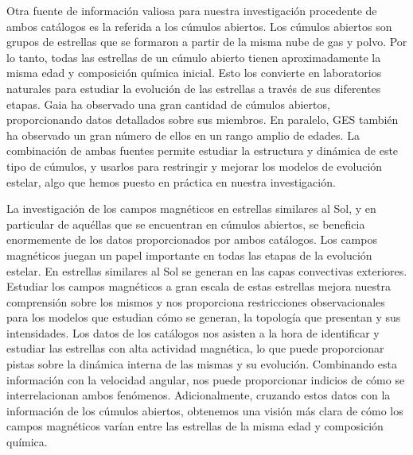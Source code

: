 Otra fuente de información valiosa para nuestra investigación procedente de ambos catálogos es la referida a los cúmulos abiertos. Los cúmulos abiertos son grupos de estrellas que se formaron a partir de la misma nube de gas y polvo. Por lo tanto, todas las estrellas de un cúmulo abierto tienen aproximadamente la misma edad y composición química inicial. Esto los convierte en laboratorios naturales para estudiar la evolución de las estrellas a través de sus diferentes etapas. Gaia ha observado una gran cantidad de cúmulos abiertos, proporcionando datos detallados sobre sus miembros. En paralelo, GES también ha observado un gran número de ellos en un rango amplio de edades. La combinación de ambas fuentes permite estudiar la estructura y dinámica de este tipo de cúmulos, y usarlos para restringir y mejorar los modelos de evolución estelar, algo que hemos puesto en práctica en nuestra investigación.\par

La investigación de los campos magnéticos en estrellas similares al Sol, y en particular de aquéllas que se encuentran en cúmulos abiertos, se beneficia enormemente de los datos proporcionados por ambos catálogos. Los campos magnéticos juegan un papel importante en todas las etapas de la evolución estelar. En estrellas similares al Sol se generan en las capas convectivas exteriores. Estudiar los campos magnéticos a gran escala de estas estrellas mejora nuestra comprensión sobre los mismos y nos proporciona restricciones observacionales para los modelos que estudian cómo se generan, la topología que presentan y sus intensidades. Los datos de los catálogos nos asisten a la hora de identificar y estudiar las estrellas con alta actividad magnética, lo que puede proporcionar pistas sobre la dinámica interna de las mismas y su evolución. Combinando esta información con la velocidad angular, nos puede proporcionar indicios de cómo se interrelacionan ambos fenómenos. Adicionalmente, cruzando estos datos con la información de los cúmulos abiertos, obtenemos una visión más clara de cómo los campos magnéticos varían entre las estrellas de la misma edad y composición química.\par


